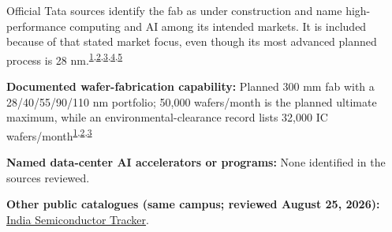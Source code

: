 \begin{minipage}[t][0.90\textheight][t]{\textwidth}
\begin{minipage}[t]{\textwidth}
\begin{minipage}[t]{0.32\textwidth}
\medskip
{\footnotesize Official Tata sources identify the fab as under construction and name high-performance computing and AI among its intended markets. It is included because of that stated market focus, even though its most advanced planned process is 28 nm.\nobreak\textsuperscript{\href{\detokenize{https://environmentclearance.nic.in/writereaddata/FormB/agenda/0801202511837869SEACMinutesofthe982ndVC.pdf}}{\textcolor{accent}{1}},\href{\detokenize{https://www.tata.com/newsroom/business/first-indian-fab-semiconductor-dholera}}{\textcolor{accent}{2}},\href{\detokenize{https://www.tata.com/newsroom/business/tata-electronics-asml-semiconductor-ecosystem}}{\textcolor{accent}{3}},\href{\detokenize{https://sezindia.gov.in/node/2838}}{\textcolor{accent}{4}},\href{\detokenize{https://www.tata.com/content/dam/tata/pdf/fy25/Tata-Sons-Annual-Report-FY25.pdf}}{\textcolor{accent}{5}}}\par}
\medskip
{\footnotesize\textbf{Documented wafer-fabrication capability:} Planned 300 mm fab with a 28/40/55/90/110 nm portfolio; 50,000 wafers/month is the planned ultimate maximum, while an environmental-clearance record lists 32,000 IC wafers/month\nobreak\textsuperscript{\href{\detokenize{https://environmentclearance.nic.in/writereaddata/FormB/agenda/0801202511837869SEACMinutesofthe982ndVC.pdf}}{\textcolor{accent}{1}},\href{\detokenize{https://www.tata.com/newsroom/business/first-indian-fab-semiconductor-dholera}}{\textcolor{accent}{2}},\href{\detokenize{https://www.tata.com/newsroom/business/tata-electronics-asml-semiconductor-ecosystem}}{\textcolor{accent}{3}}}\par}
\end{minipage}
\end{minipage}
\par\vspace{0.65em}
\medskip
{\footnotesize\textbf{Named data-center AI accelerators or programs:} None identified in the sources reviewed.\par}
\smallskip
{\sffamily\scriptsize\color{black!62}\textbf{Other public catalogues (same campus; reviewed August 25, 2026):} \href{\detokenize{https://github.com/pranaykotas/india-semiconductor-tracker/blob/4d36dae28b2f25c2ffc8236ca1246142a79ce324/data/facilities.yml}\#\detokenize{L63-L77}}{India Semiconductor Tracker}.\par}
\medskip

\end{minipage}
